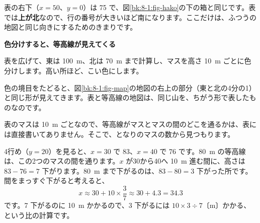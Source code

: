 表の右下（$x=50$、$y=0$）は 75 で、図\ref{bk:8-1:fig-hako}の下の箱と同じです。表では\textbf{上が北}なので、行の番号が大きいほど南になります。ここだけは、ふつうの地図と同じ向きにするためのきまりです。

\noindent\textbf{色分けすると、等高線が見えてくる}\par\nobreak\vspace{2pt}
表を広げて、東は \qty{100}{m}、北は \qty{70}{m} まで計算し、マスを高さ \qty{10}{m} ごとに色分けします。高い所ほど、こい色にします。

\begin{bkfigure}
\label{bk:8-1:fig-iro}
\end{bkfigure}

色の境目をたどると、図\ref{bk:8-1:fig-map}の地図の右上の部分（東と北の4分の1）と同じ形が見えてきます。表と等高線の地図は、同じ山を、ちがう形で表したものなのです。


\label{bk:8-1:mitsumori}表のマスは \qty{10}{m} ごとなので、等高線がマスとマスの間のどこを通るかは、表には直接書いてありません。そこで、となりのマスの数から見つもります。

4行め（$y=20$）を見ると、$x=30$ で 83、$x=40$ で 76 です。\qty{80}{m} の等高線は、この2つのマスの間を通ります。$x$ が30から40へ \qty{10}{m} 進む間に、高さは $83-76=7$ 下がります。\qty{80}{m} まで下がるのは、$83-80=3$ 下がった所です。間をまっすぐ下がると考えると、
\[ x\approx30+10\times\frac{3}{7}\approx30+4.3=34.3 \]
です。7 下がるのに \qty{10}{m} かかるので、3 下がるには $10\times3\div7$〔m〕かかる、という比の計算です。

